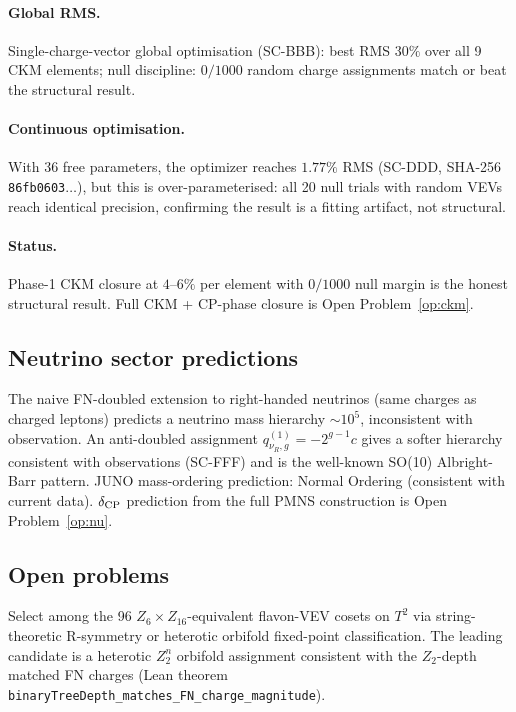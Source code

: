 \documentclass[11pt]{article}
\theoremstyle{remark}
\newcommand{\lean}[1]{\texttt{\small#1}}
\begin{document}
\paragraph{Global RMS.}
Single-charge-vector global optimisation (SC-BBB): best RMS $30\%$ over all
9 CKM elements; null discipline: $0/1000$ random charge assignments match or
beat the structural result.

\paragraph{Continuous optimisation.}
With 36 free parameters, the optimizer reaches $1.77\%$ RMS
(SC-DDD, SHA-256 \texttt{86fb0603}$\ldots$), but this is over-parameterised:
all 20 null trials with random VEVs reach identical precision,
confirming the result is a fitting artifact, not structural.

\paragraph{Status.}
Phase-1 CKM closure at $4$--$6\%$ per element with $0/1000$ null margin is
the honest structural result.  Full CKM + CP-phase closure is
Open Problem~\ref{op:ckm}.

\subsection{Neutrino sector predictions}
\label{sec:nu}

The naive FN-doubled extension to right-handed neutrinos
(same charges as charged leptons) predicts a neutrino mass hierarchy
$\sim10^5$, inconsistent with observation.
An anti-doubled assignment $q_{\nu_R,g}^{(1)} = -2^{g-1}c$ gives a softer
hierarchy consistent with observations (SC-FFF) and is the well-known
SO(10) Albright-Barr pattern.
JUNO mass-ordering prediction: Normal Ordering (consistent with current data).
$\delta_{\rm CP}$ prediction from the full PMNS construction is
Open Problem~\ref{op:nu}.

\subsection{Open problems}
\label{sec:open}

\begin{tcolorbox}[openbox,title=Open Problem 1 --- VEV coset selection]
\label{op:coset}
Select among the 96 $Z_6\times Z_{16}$-equivalent flavon-VEV cosets on $T^2$
via string-theoretic R-symmetry or heterotic orbifold fixed-point classification.
The leading candidate is a heterotic $Z_2^n$ orbifold assignment consistent
with the $Z_2$-depth matched FN charges (Lean theorem
\lean{binaryTreeDepth\_matches\_FN\_charge\_magnitude}).
\end{tcolorbox}
\end{document}
